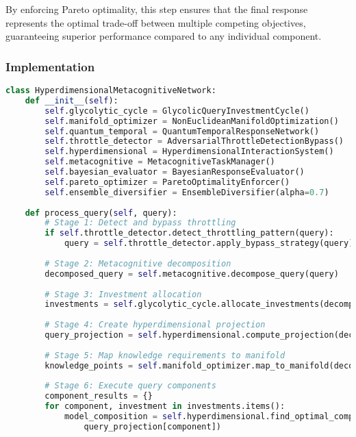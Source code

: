 \documentclass[journal,onecolumn]{IEEEtran}
\begin{document}
By enforcing Pareto optimality, this step ensures that the final response represents the optimal trade-off between multiple competing objectives, guaranteeing superior performance compared to any individual component.

\subsubsection{Implementation}

\begin{lstlisting}[language=Python, caption=CDKS Implementation Pseudocode]
class HyperdimensionalMetacognitiveNetwork:
    def __init__(self):
        self.glycolytic_cycle = GlycolicQueryInvestmentCycle()
        self.manifold_optimizer = NonEuclideanManifoldOptimization()
        self.quantum_temporal = QuantumTemporalResponseNetwork()
        self.throttle_detector = AdversarialThrottleDetectionBypass()
        self.hyperdimensional = HyperdimensionalInteractionSystem()
        self.metacognitive = MetacognitiveTaskManager()
        self.bayesian_evaluator = BayesianResponseEvaluator()
        self.pareto_optimizer = ParetoOptimalityEnforcer()
        self.ensemble_diversifier = EnsembleDiversifier(alpha=0.7)
        
    def process_query(self, query):
        # Stage 1: Detect and bypass throttling
        if self.throttle_detector.detect_throttling_pattern(query):
            query = self.throttle_detector.apply_bypass_strategy(query)
        
        # Stage 2: Metacognitive decomposition
        decomposed_query = self.metacognitive.decompose_query(query)
        
        # Stage 3: Investment allocation
        investments = self.glycolytic_cycle.allocate_investments(decomposed_query)
        
        # Stage 4: Create hyperdimensional projection
        query_projection = self.hyperdimensional.compute_projection(decomposed_query)
        
        # Stage 5: Map knowledge requirements to manifold
        knowledge_points = self.manifold_optimizer.map_to_manifold(decomposed_query)
        
        # Stage 6: Execute query components
        component_results = {}
        for component, investment in investments.items():
            model_composition = self.hyperdimensional.find_optimal_composition(
                query_projection[component])
            

\end{lstlisting}
\end{document}
